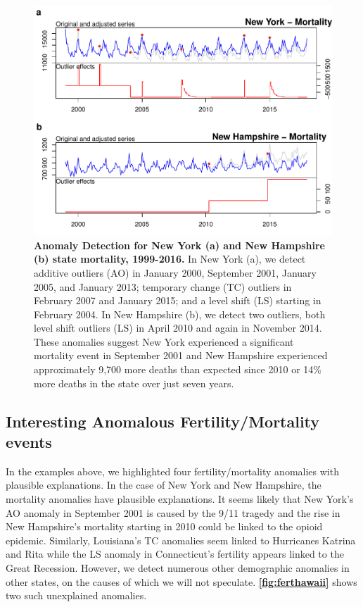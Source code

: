 \documentclass[12pt]{article}
\begin{document}
\begin{figure}
\centering
\includegraphics{manuscript_files/figure-latex/MortalityAnomalies-1.pdf}
\caption{\textbf{Anomaly Detection for New York (a) and New Hampshire (b) state mortality, 1999-2016.}
In New York (a), we detect additive outliers (AO) in January 2000,
September 2001, January 2005, and January 2013; temporary change (TC)
outliers in February 2007 and January 2015; and a level shift (LS)
starting in February 2004. In New Hampshire (b), we detect two outliers,
both level shift outliers (LS) in April 2010 and again in November 2014.
These anomalies suggest New York experienced a significant mortality
event in September 2001 and New Hampshire experienced approximately
9,700 more deaths than expected since 2010 or 14\% more deaths in the
state over just seven years. \label{fig:mortnewhamp}}
\end{figure}

\hypertarget{interesting-anomalous-fertilitymortality-events}{%
\subsection{Interesting Anomalous Fertility/Mortality
events}\label{interesting-anomalous-fertilitymortality-events}}

In the examples above, we highlighted four fertility/mortality anomalies
with plausible explanations. In the case of New York and New Hampshire,
the mortality anomalies have plausible explanations. It seems likely
that New York's AO anomaly in September 2001 is caused by the 9/11
tragedy and the rise in New Hampshire's mortality starting in 2010 could
be linked to the opioid epidemic. Similarly, Louisiana's TC anomalies
seem linked to Hurricanes Katrina and Rita while the LS anomaly in
Connecticut's fertility appears linked to the Great Recession. However,
we detect numerous other demographic anomalies in other states, on the
causes of which we will not speculate. \textbf{\autoref{fig:ferthawaii}}
shows two such unexplained anomalies.
\end{document}
